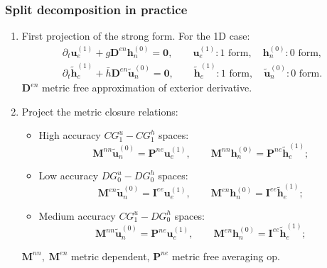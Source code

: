 \documentclass{beamer}
\begin{document}
\begin{frame}\frametitle{Split decomposition in practice}
\begin{enumerate}
\item First projection of the strong form.  For the 1D case:
\begin{equation*}
	\begin{aligned}
		\partial_t \mathbf{u}_e^{(1)} + g \mathbf{D}^{en} \mathbf{h}_n^{(0)} = \mathbf{0}, \qquad \mathbf{u}_e^{(1)}: \text{1 form}, \quad \mathbf{h}_n^{(0)}: \text{0 form}, \\
		\partial_t \widetilde{\mathbf{h}}_e^{(1)} + \bar{h} \mathbf{D}^{en} \widetilde{\mathbf{u}}_n^{(0)} = \mathbf{0}, \qquad \widetilde{\mathbf{h}}_e^{(1)}: \text{1 form}, \quad \widetilde{\mathbf{u}}_n^{(0)}: \text{0 form}.
	\end{aligned}
\end{equation*}
$\mathbf{D}^{en}$ metric free approximation of exterior derivative. \vspace{.3cm}
\item Project the metric closure relations:
\begin{itemize}
	\item High accuracy $CG_1^u-CG_1^h$ spaces: 
	$$\mathbf{M}^{nn} \widetilde{\mathbf{u}}_n^{(0)}=\mathbf{P}^{ne}\mathbf{u}_e^{(1)}, \qquad \mathbf{M}^{nn} \mathbf{h}_n^{(0)}=\mathbf{P}^{ne}\widetilde{\mathbf{h}}_e^{(1)};$$
	\item Low accuracy $DG_0^u-DG_0^h$ spaces: 
	$$\mathbf{M}^{en} \widetilde{\mathbf{u}}_n^{(0)}=\mathbf{I}^{ee}\mathbf{u}_e^{(1)}, \qquad \mathbf{M}^{en} \mathbf{h}_n^{(0)}=\mathbf{I}^{ee}\widetilde{\mathbf{h}}_e^{(1)};$$
	\item Medium accuracy $CG_1^u-DG_0^h$ spaces: 
	$$\mathbf{M}^{nn} \widetilde{\mathbf{u}}_n^{(0)}=\mathbf{P}^{ne}\mathbf{u}_e^{(1)}, \qquad \mathbf{M}^{en} \mathbf{h}_n^{(0)}=\mathbf{I}^{ee}\widetilde{\mathbf{h}}_e^{(1)};$$
\end{itemize}
$\mathbf{M}^{nn}, \; \mathbf{M}^{en}$ metric dependent, $\mathbf{P}^{ne}$ metric free averaging op.	
\end{enumerate}

\end{frame}
\end{document}
